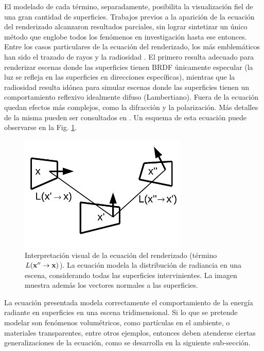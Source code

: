 El modelado de cada término, separadamente, posibilita la visualización fiel de una gran cantidad de superficies.
Trabajos previos a la aparición de la ecuación del renderizado alcanzaron resultados parciales, sin lograr sintetizar un único método que englobe todos los fenómenos en investigación hasta ese entonces.
Entre los casos particulares de la ecuación del renderizado, los más emblemáticos han sido el trazado de rayos \cite{Whitted1980} y la radiosidad \cite{Goral1984}.
El primero resulta adecuado para renderizar escenas donde las superficies tienen BRDF únicamente especular (la luz se refleja en las superficies en direcciones específicas), mientras que la radiosidad resulta idónea para simular escenas donde las superficies tienen un comportamiento reflexivo idealmente difuso (Lambertiano).
Fuera de la ecuación quedan efectos más complejos, como la difracción y la polarización.
Más detalles de la misma pueden ser consultados en \cite{Kajiya1986}.
Un esquema de esta ecuación puede observarse en la Fig. \ref{fg:rendequation}.

\begin{figure}
\center
\includegraphics[width=8cm]{figures/rendequation}
\caption[Interpretación visual de la ecuación del renderizado]{Interpretación visual de la ecuación del renderizado (término $L(\bold{x''}  \rightarrow \bold{x}) $). La ecuación modela la distribución de radiancia en una escena, considerando todas las superficies intervinientes. La imagen muestra además los vectores normales a las superficies.}
\label{fg:rendequation}
\end{figure}

La ecuación presentada modela correctamente el comportamiento de la energía radiante en superficies en una escena tridimensional.
Si lo que se pretende modelar son fenómenos volumétricos, como partículas en el ambiente, o materiales transparentes, entre otros ejemplos, entonces deben atenderse ciertas generalizaciones de la ecuación, como se desarrolla en la siguiente sub-sección.

